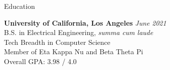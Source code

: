 \documentclass[ 10.5pt ]{resume}
\begin{document}

\begin{rSection}{Education}

	\textbf{University of California, Los Angeles} \hfill \textit{June 2021} \\
	B.S. in Electrical Engineering, \textit{summa cum laude} \\
	Tech Breadth in Computer Science \\
	Member of Eta Kappa Nu and Beta Theta Pi \\
	Overall GPA: 3.98 / 4.0

\end{rSection}

\end{document}
